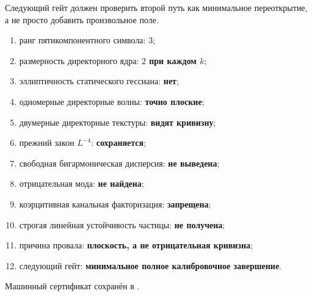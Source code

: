 Следующий гейт должен проверить второй путь как минимальное переоткрытие, а
не просто добавить произвольное поле.

\begin{protocol}
\begin{enumerate}
 \item ранг пятикомпонентного символа: \textbf{$3$};
 \item размерность директорного ядра: \textbf{$2$ при каждом $k$};
 \item эллиптичность статического гессиана: \textbf{нет};
 \item одномерные директорные волны: \textbf{точно плоские};
 \item двумерные директорные текстуры: \textbf{видят кривизну};
 \item прежний закон $L^{-4}$: \textbf{сохраняется};
 \item свободная бигармоническая дисперсия: \textbf{не выведена};
 \item отрицательная мода: \textbf{не найдена};
 \item коэрцитивная канальная факторизация: \textbf{запрещена};
 \item строгая линейная устойчивость частицы: \textbf{не получена};
 \item причина провала: \textbf{плоскость, а не отрицательная кривизна};
 \item следующий гейт: \textbf{минимальное полное калибровочное
 завершение}.
\end{enumerate}
\end{protocol}

Машинный сертификат сохранён в
.